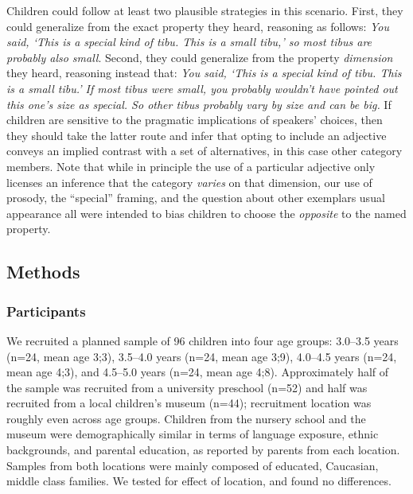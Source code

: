 \documentclass[man]{apa2}
\begin{document}
Children could follow at least two plausible strategies in this scenario. First, they could generalize from the exact property they heard, reasoning as follows: \emph{You said, `This is a special kind of tibu. This is a small tibu,' so most tibus are probably also small}. Second, they could generalize from the property \emph{dimension} they heard, reasoning instead that: \emph{You said, `This is a special kind of tibu. This is a small tibu.' If most tibus were small, you probably wouldn't have pointed out this one's size as special. So other tibus probably vary by size and can be big.} If children are sensitive to the pragmatic implications of speakers' choices, then they should take the latter route and infer that opting to include an adjective conveys an implied contrast with a set of alternatives, in this case other category members. Note that while in principle the use of a particular adjective only licenses an inference that the category \emph{varies} on that dimension, our use of prosody, the ``special'' framing, and the question about other exemplars usual appearance all were intended to bias children to choose the \emph{opposite} to the named property.


\subsection{Methods}

\subsubsection{Participants}

We recruited a planned sample of 96 children into four age groups: 3.0--3.5 years (n=24, mean age 3;3), 3.5--4.0 years (n=24, mean age 3;9), 4.0--4.5 years (n=24, mean age 4;3), and 4.5--5.0 years (n=24, mean age 4;8).  Approximately half of the sample was recruited from a university preschool (n=52) and half was recruited from a local children's museum (n=44); recruitment location was roughly even across age groups. Children from the nursery school and the museum were demographically similar in terms of language exposure, ethnic backgrounds, and parental education, as reported by parents from each location.  Samples from both locations were mainly composed of educated, Caucasian, middle class families.  We tested for effect of location, and found no differences.
\end{document}
